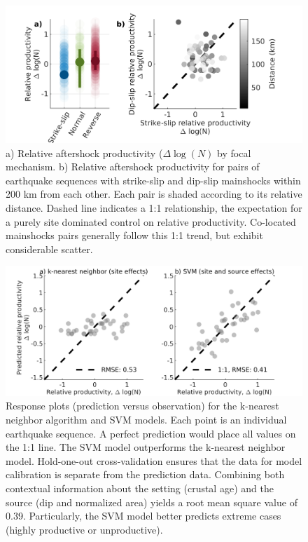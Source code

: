 \documentclass[draft]{agujournal}
\begin{document}
\begin{figure}[H]
\centering
\includegraphics{figures/fmspairs_mw5.png}
\caption{a) Relative aftershock productivity ($\Delta \log(N)$ by focal mechanism. b) Relative aftershock productivity for pairs of earthquake sequences with strike-slip and dip-slip mainshocks within 200 km from each other. Each pair is shaded according to its relative distance. Dashed line indicates a 1:1 relationship, the expectation for a purely site dominated control on relative productivity. Co-located mainshocks pairs generally follow this 1:1 trend, but exhibit considerable scatter.}
\end{figure}

\begin{figure}[H]
\centering
\includegraphics{figures/response_mw5.png}
\caption{Response plots (prediction versus observation) for the k-nearest neighbor algorithm and SVM models. Each point is an individual earthquake sequence. A perfect prediction would place all values on the 1:1 line. The SVM model outperforms the k-nearest neighbor model. Hold-one-out cross-validation ensures that the data for model calibration is separate from the prediction data. Combining both contextual information about the setting (crustal age) and the source (dip and normalized area) yields a root mean square value of 0.39. Particularly, the SVM model better predicts extreme cases (highly productive or unproductive).}
\label{fig:response}
\end{figure}
\end{document}
